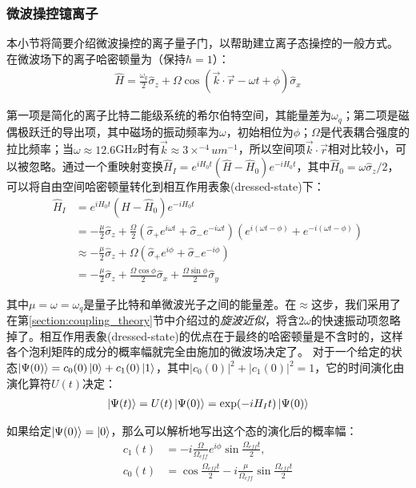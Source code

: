 \subsubsection[微波操控镱离子]{微波操控镱离子\label{section:microwave_operation}}
本小节将简要介绍微波操控的离子量子门，以帮助建立离子态操控的一般方式。
在微波场下的离子哈密顿量为（保持$\hbar=1$）：
\begin{align}
    \hat{H}=\frac{\omega_q}{2}\hat{\sigma}_z + \Omega\cos\left(\vec{k}\cdot\vec{r}-\omega t + \phi\right)\hat{\sigma}_x
\end{align}

第一项是简化的离子比特二能级系统的希尔伯特空间，其能量差为$\omega_q$；第二项是磁偶极跃迁的导出项，其中磁场的振动频率为$\omega$，初始相位为$\phi$；$\Omega$是代表耦合强度的拉比频率；当$\omega\approx 12.6$GHz时有$\vec{k}\approx3\times ^{-4}um^{-1}$，所以空间项$\vec{k}\cdot \vec{r}$相对比较小，可以被忽略。通过一个重映射变换$\hat{H}_I=e^{iH_0t}(\hat{H}-\hat{H}_0)e^{-iH_0t}$，其中$\hat{H}_0=\omega\hat{\sigma}_z/2$，可以将自由空间哈密顿量转化到相互作用表象(dressed-state)下：
\begin{align}
    \hat{H}_I&=e^{iH_0t}(\hat{H}-\hat{H}_0)e^{-iH_0t}\\
    &=-\frac{\mu}{2}\hat{\sigma}_z+\frac{\Omega}{2}\left(\hat{\sigma}_+e^{i\omega t}+\hat{\sigma}_-e^{-i\omega t}\right)\left(e^{i(\omega t-\phi)}+e^{-i(\omega t-\phi)}\right)\\
    &\approx -\frac{\mu}{2}\hat{\sigma}_z+\Omega(\hat{\sigma}_+e^{i\phi}+\hat{\sigma}_-e^{-i\phi})\\
    &=-\frac{\mu}{2}\hat{\sigma}_z+\frac{\Omega\cos{\phi}}{2}\hat{\sigma}_x+\frac{\Omega\sin{\phi}}{2}\hat{\sigma}_y\label{eq:interaction_hamiltonian_microwave}
\end{align}

其中$\mu=\omega=\omega_q$是量子比特和单微波光子之间的能量差。在$\approx$这步，我们采用了在第\ref{section:coupling_theory}节中介绍过的\emph{旋波近似}，将含$2\omega$的快速振动项忽略掉了。相互作用表象(dressed-state)的优点在于最终的哈密顿量是不含时的，这样各个泡利矩阵的成分的概率幅就完全由施加的微波场决定了。
对于一个给定的状态$\ket{\Psi(0)}=c_0(0)\ket{0}+c_1(0)\ket{1}$，其中$|c_0(0)|^2+|c_1(0)|^2=1$，它的时间演化由演化算符$U(t)$决定：
\begin{align}
    \ket{\Psi(t)}=U(t)\ket{\Psi(0)}=\exp(-iH_It)\ket{\Psi(0)}
\end{align}

如果给定$\ket{\Psi(0)}=\ket{0}$，那么可以解析地写出这个态的演化后的概率幅：
\begin{align}
    c_1(t)&=-i\frac{\Omega}{\Omega_{eff}}e^{i\phi}\sin{\frac{\Omega_{eff}t}{2}},\\
    c_0(t)&=\cos{\frac{\Omega_{eff}t}{2}}-i\frac{\mu}{\Omega_{eff}}\sin{\frac{\Omega_{eff}t}{2}}
\end{align}

